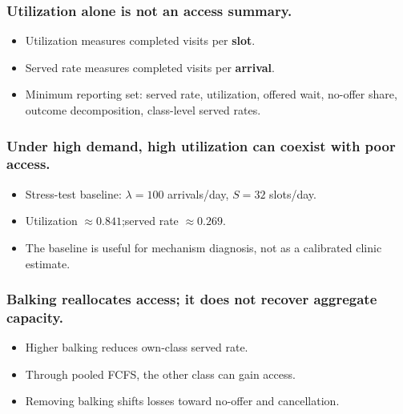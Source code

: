 \documentclass[18pt,aspectratio=169]{beamer}
\begin{document}

\begin{frame}
  \frametitle{Utilization alone is not an access summary.}
  \vspace{0.6em}
  \begin{itemize}
    \setlength{\itemsep}{0.9em}
    \item Utilization measures completed visits per \textbf{slot}.
    \item Served rate measures completed visits per \textbf{arrival}.
    \item Minimum reporting set: served rate, utilization, offered wait,
          no-offer share, outcome decomposition, class-level served rates.
  \end{itemize}
\end{frame}

\begin{frame}
  \frametitle{Under high demand, high utilization can coexist with poor access.}
  \vspace{0.6em}
  \begin{itemize}
    \setlength{\itemsep}{0.9em}
    \item Stress-test baseline: $\lambda = 100$ arrivals/day, $S = 32$ slots/day.
    \item Utilization $\approx 0.841$;\enspace served rate $\approx 0.269$.
    \item The baseline is useful for mechanism diagnosis, not as a calibrated
          clinic estimate.
  \end{itemize}
\end{frame}

\begin{frame}
  \frametitle{Balking reallocates access; it does not recover aggregate capacity.}
  \vspace{0.6em}
  \begin{itemize}
    \setlength{\itemsep}{0.9em}
    \item Higher balking reduces own-class served rate.
    \item Through pooled FCFS, the other class can gain access.
    \item Removing balking shifts losses toward no-offer and cancellation.
  \end{itemize}
\end{frame}
\end{document}
